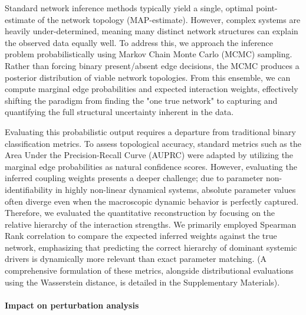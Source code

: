 \documentclass[10pt, aps, rmp,  twocolumn, superscriptaddress, floatfix, showkeys]{revtex4-2}
\begin{document}
Standard network inference methods typically yield a single, optimal point-estimate of the network topology (MAP-estimate). However, complex systems are heavily under-determined, meaning many distinct network structures can explain the observed data equally well. To address this, we approach the inference problem probabilistically using Markov Chain Monte Carlo (MCMC) sampling. Rather than forcing binary present/absent edge decisions, the MCMC produces a posterior distribution of viable network topologies. From this ensemble, we can compute marginal edge probabilities and expected interaction weights, effectively shifting the paradigm from finding the "one true network" to capturing and quantifying the full structural uncertainty inherent in the data.

Evaluating this probabilistic output requires a departure from traditional binary classification metrics. To assess topological accuracy, standard metrics such as the Area Under the Precision-Recall Curve (AUPRC) were adapted by utilizing the marginal edge probabilities as natural confidence scores. However, evaluating the inferred coupling weights presents a deeper challenge; due to parameter non-identifiability in highly non-linear dynamical systems, absolute parameter values often diverge even when the macroscopic dynamic behavior is perfectly captured. Therefore, we evaluated the quantitative reconstruction by focusing on the relative hierarchy of the interaction strengths. We primarily employed Spearman Rank correlation to compare the expected inferred weights against the true network, emphasizing that predicting the correct hierarchy of dominant systemic drivers is dynamically more relevant than exact parameter matching. (A comprehensive formulation of these metrics, alongside distributional evaluations using the Wasserstein distance, is detailed in the Supplementary Materials).


\paragraph{Impact on perturbation analysis\\}

\end{document}
